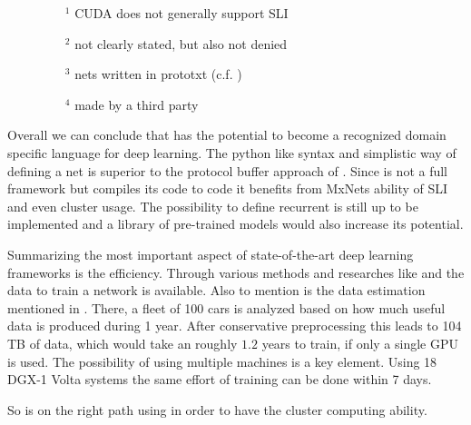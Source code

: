 \vspace{-1em}
\begin{figure}[H]
	\footnotesize
	\begin{multicols}{2}
	\begin{itemize}
		\item[$^1$] CUDA does not generally support SLI
		\item[$^2$] not clearly stated, but also not denied
		\item[$^3$] nets written in prototxt (c.f. )
		\item[$^4$] made by a third party\cite{CaffeOnSpark}
	\end{itemize}
	\end{multicols}
\end{figure}

Overall we can conclude that \cnnarch has the potential to become a recognized domain specific language for deep learning. The python like syntax and simplistic way of defining a net is superior to the protocol buffer approach of \caffe. Since \cnnarch is not a full framework but compiles its code to \mxnet code it benefits from MxNets ability of SLI and even cluster usage. The possibility to define recurrent \nns is still up to be implemented and a library of pre-trained models would also increase its potential.

Summarizing the most important aspect of state-of-the-art deep learning frameworks is the efficiency. Through various methods and researches like \kitti and \torcs the data to train a network is available.
Also to mention is the data estimation mentioned in \cite{grzywaczewski2017training}. There, a fleet of 100 cars is analyzed based on how much useful data is produced during 1 year. After conservative preprocessing this leads to 104 TB of data, which would take an \alexnet roughly $1.2$ years to train, if only a single GPU is used. The possibility of using multiple machines is a key element. Using 18 DGX-1 Volta systems the same effort of training can be done within 7 days.

So \cnnarch is on the right path using \mxnet in order to have the cluster computing ability.


